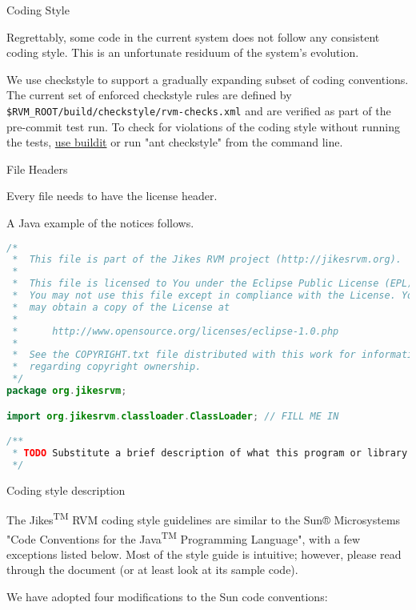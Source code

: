 \begin{section}{Coding Style}
\label{sec:codingstyle}

Regrettably, some code in the current system does not follow any consistent coding style. This is an unfortunate residuum of the system's evolution.

We use checkstyle to support a gradually expanding subset of coding conventions.  The current set of enforced checkstyle rules are defined by \texttt{\$RVM\_ROOT/build/check\-style/rvm-checks.xml} and are verified as part of the pre-commit test run. To check for violations of the coding style without running the tests, \hyperref[sec:usingbuildit]{use buildit} or run "ant checkstyle" from the command line.

\begin{subsection}{File Headers}

Every file needs to have the license header.

A Java example of the notices follows.

\begin{lstlisting}[language=Java]
/*
 *  This file is part of the Jikes RVM project (http://jikesrvm.org).
 *
 *  This file is licensed to You under the Eclipse Public License (EPL);
 *  You may not use this file except in compliance with the License. You
 *  may obtain a copy of the License at
 *
 *      http://www.opensource.org/licenses/eclipse-1.0.php
 *
 *  See the COPYRIGHT.txt file distributed with this work for information
 *  regarding copyright ownership.
 */
package org.jikesrvm;

import org.jikesrvm.classloader.ClassLoader; // FILL ME IN

/**
 * TODO Substitute a brief description of what this program or library does.
 */
\end{lstlisting}

\end{subsection}

\begin{subsection}{Coding style description}

The Jikes\textsuperscript{TM} RVM coding style guidelines are similar to the Sun® Microsystems "Code Conventions for the Java\textsuperscript{TM} Programming Language", with a few exceptions listed below. Most of the style guide is intuitive; however, please read through the document (or at least look at its sample code).

We have adopted four modifications to the Sun code conventions:


\end{subsection}
\end{section}
